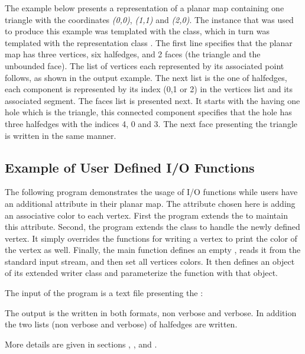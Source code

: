 \begin{ccAdvanced}
The example below presents a representation of a planar map containing
one triangle with the coordinates {\em (0,0)}, {\em (1,1)} and {\em
(2,0)}.  The  instance that was used to produce this
example was templated with the 
class, which in turn was templated with the representation class
.  The first line specifies that the
planar map has three vertices, six halfedges, and 2 faces (the
triangle and the unbounded face).  The list of vertices each
represented by its associated point follows, as shown in the output
example.  The next list is the one of halfedges, each component is
represented by its index (0,1 or 2) in the vertices list and its
associated segment.  The faces list is presented next. It starts with
the  having one hole which is the triangle,
this connected component specifies that the hole has three halfedges
with the indices 4, 0 and 3. The next face presenting the triangle is
written in the same manner.


\subsection{Example of User Defined I/O Functions}
\label{PM_sec:example10}

The following program demonstrates the usage of I/O functions while
users have an additional attribute in their planar map.
The attribute chosen here is adding an associative color to each
vertex. First the program extends the  to maintain this
attribute. Second, the program extends the  class
to handle the newly defined vertex. 
It simply overrides the functions for writing a vertex to print the
color of the vertex as well. Finally, the main function defines an
empty , reads it from the standard input stream, and
then set all vertices colors. It then defines an object of its
extended writer class and parameterize the function 
with that object.


The input of the program is a text file presenting the :

The output is the  written in both formats, non
verbose and verbose. In addition the two lists (non verbose and
verbose) of halfedges are written.

More details are given in sections
,
, 
 and
.

\end{ccAdvanced}

